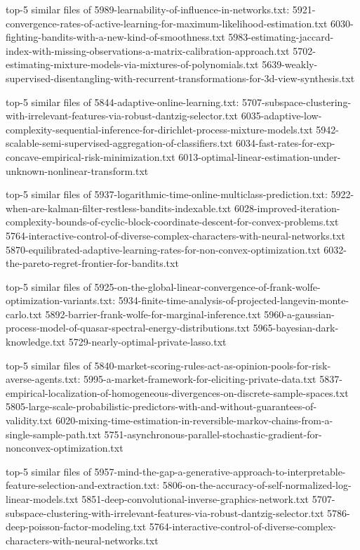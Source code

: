 \documentclass[11pt]{article}
\begin{document}
top-5 similar files of 5989-learnability-of-influence-in-networks.txt:
5921-convergence-rates-of-active-learning-for-maximum-likelihood-estimation.txt
6030-fighting-bandits-with-a-new-kind-of-smoothness.txt
5983-estimating-jaccard-index-with-missing-observations-a-matrix-calibration-approach.txt
5702-estimating-mixture-models-via-mixtures-of-polynomials.txt
5639-weakly-supervised-disentangling-with-recurrent-transformations-for-3d-view-synthesis.txt

top-5 similar files of 5844-adaptive-online-learning.txt:
5707-subspace-clustering-with-irrelevant-features-via-robust-dantzig-selector.txt
6035-adaptive-low-complexity-sequential-inference-for-dirichlet-process-mixture-models.txt
5942-scalable-semi-supervised-aggregation-of-classifiers.txt
6034-fast-rates-for-exp-concave-empirical-risk-minimization.txt
6013-optimal-linear-estimation-under-unknown-nonlinear-transform.txt

top-5 similar files of
5937-logarithmic-time-online-multiclass-prediction.txt:
5922-when-are-kalman-filter-restless-bandits-indexable.txt
6028-improved-iteration-complexity-bounds-of-cyclic-block-coordinate-descent-for-convex-problems.txt
5764-interactive-control-of-diverse-complex-characters-with-neural-networks.txt
5870-equilibrated-adaptive-learning-rates-for-non-convex-optimization.txt
6032-the-pareto-regret-frontier-for-bandits.txt

top-5 similar files of
5925-on-the-global-linear-convergence-of-frank-wolfe-optimization-variants.txt:
5934-finite-time-analysis-of-projected-langevin-monte-carlo.txt
5892-barrier-frank-wolfe-for-marginal-inference.txt
5960-a-gaussian-process-model-of-quasar-spectral-energy-distributions.txt
5965-bayesian-dark-knowledge.txt 5729-nearly-optimal-private-lasso.txt

top-5 similar files of
5840-market-scoring-rules-act-as-opinion-pools-for-risk-averse-agents.txt:
5995-a-market-framework-for-eliciting-private-data.txt
5837-empirical-localization-of-homogeneous-divergences-on-discrete-sample-spaces.txt
5805-large-scale-probabilistic-predictors-with-and-without-guarantees-of-validity.txt
6020-mixing-time-estimation-in-reversible-markov-chains-from-a-single-sample-path.txt
5751-asynchronous-parallel-stochastic-gradient-for-nonconvex-optimization.txt

top-5 similar files of
5957-mind-the-gap-a-generative-approach-to-interpretable-feature-selection-and-extraction.txt:
5806-on-the-accuracy-of-self-normalized-log-linear-models.txt
5851-deep-convolutional-inverse-graphics-network.txt
5707-subspace-clustering-with-irrelevant-features-via-robust-dantzig-selector.txt
5786-deep-poisson-factor-modeling.txt
5764-interactive-control-of-diverse-complex-characters-with-neural-networks.txt
\end{document}
